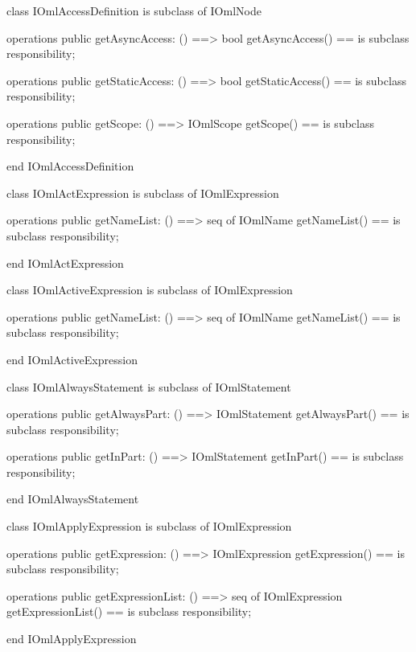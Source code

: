 \begin{vdm_al}
class IOmlAccessDefinition
 is subclass of IOmlNode

operations
  public getAsyncAccess: () ==> bool
  getAsyncAccess() == is subclass responsibility;

operations
  public getStaticAccess: () ==> bool
  getStaticAccess() == is subclass responsibility;

operations
  public getScope: () ==> IOmlScope
  getScope() == is subclass responsibility;

end IOmlAccessDefinition
\end{vdm_al}

\begin{vdm_al}
class IOmlActExpression
 is subclass of IOmlExpression

operations
  public getNameList: () ==> seq of IOmlName
  getNameList() == is subclass responsibility;

end IOmlActExpression
\end{vdm_al}

\begin{vdm_al}
class IOmlActiveExpression
 is subclass of IOmlExpression

operations
  public getNameList: () ==> seq of IOmlName
  getNameList() == is subclass responsibility;

end IOmlActiveExpression
\end{vdm_al}

\begin{vdm_al}
class IOmlAlwaysStatement
 is subclass of IOmlStatement

operations
  public getAlwaysPart: () ==> IOmlStatement
  getAlwaysPart() == is subclass responsibility;

operations
  public getInPart: () ==> IOmlStatement
  getInPart() == is subclass responsibility;

end IOmlAlwaysStatement
\end{vdm_al}

\begin{vdm_al}
class IOmlApplyExpression
 is subclass of IOmlExpression

operations
  public getExpression: () ==> IOmlExpression
  getExpression() == is subclass responsibility;

operations
  public getExpressionList: () ==> seq of IOmlExpression
  getExpressionList() == is subclass responsibility;

end IOmlApplyExpression
\end{vdm_al}

